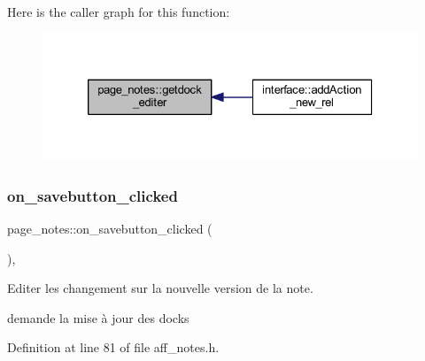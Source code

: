Here is the caller graph for this function\+:\nopagebreak
\begin{figure}[H]
\begin{center}
\leavevmode
\includegraphics[width=326pt]{classpage__notes_ad6002a4d63da2fbfa4a12a591a0d436e_icgraph}
\end{center}
\end{figure}
\mbox{\label{classpage__notes_a3810696feb56abdad663cb7ae4b2f1b0}} 
\subsubsection{\texorpdfstring{on\+\_\+savebutton\+\_\+clicked}{on\_savebutton\_clicked}}
{\footnotesize\ttfamily page\+\_\+notes\+::on\+\_\+savebutton\+\_\+clicked (\begin{DoxyParamCaption}{ }\end{DoxyParamCaption})\hspace{0.3cm}{\ttfamily [inline]}, {\ttfamily [slot]}}



Editer les changement sur la nouvelle version de la note. 

demande la mise à jour des docks 

Definition at line 81 of file aff\+\_\+notes.\+h.

